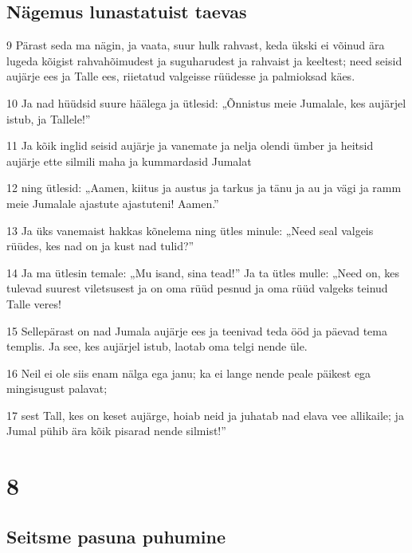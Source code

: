 \section*{Nägemus lunastatuist taevas}

\par 9 Pärast seda ma nägin, ja vaata, suur hulk rahvast, keda ükski ei võinud ära lugeda kõigist rahvahõimudest ja suguharudest ja rahvaist ja keeltest; need seisid aujärje ees ja Talle ees, riietatud valgeisse rüüdesse ja palmioksad käes.
\par 10 Ja nad hüüdsid suure häälega ja ütlesid: „Õnnistus meie Jumalale, kes aujärjel istub, ja Tallele!”
\par 11 Ja kõik inglid seisid aujärje ja vanemate ja nelja olendi ümber ja heitsid aujärje ette silmili maha ja kummardasid Jumalat
\par 12 ning ütlesid: „Aamen, kiitus ja austus ja tarkus ja tänu ja au ja vägi ja ramm meie Jumalale ajastute ajastuteni! Aamen.”
\par 13 Ja üks vanemaist hakkas kõnelema ning ütles minule: „Need seal valgeis rüüdes, kes nad on ja kust nad tulid?”
\par 14 Ja ma ütlesin temale: „Mu isand, sina tead!” Ja ta ütles mulle: „Need on, kes tulevad suurest viletsusest ja on oma rüüd pesnud ja oma rüüd valgeks teinud Talle veres!
\par 15 Sellepärast on nad Jumala aujärje ees ja teenivad teda ööd ja päevad tema templis. Ja see, kes aujärjel istub, laotab oma telgi nende üle.
\par 16 Neil ei ole siis enam nälga ega janu; ka ei lange nende peale päikest ega mingisugust palavat;
\par 17 sest Tall, kes on keset aujärge, hoiab neid ja juhatab nad elava vee allikaile; ja Jumal pühib ära kõik pisarad nende silmist!”


\chapter{8}

\section*{Seitsme pasuna puhumine}


